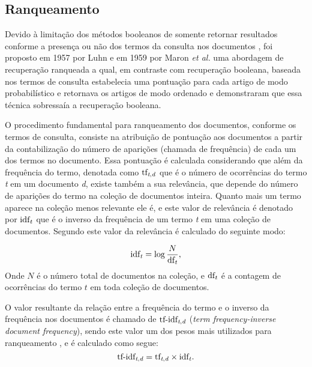 \subsection{Ranqueamento} \label{subsec:Ranqueamento}
Devido à limitação dos métodos booleanos de somente retornar resultados conforme a presença ou não dos termos da consulta nos documentos \cite[p.~100]{Manning2008IIR}, foi proposto em 1957 por Luhn e em 1959 por Maron \textit{et al.} uma abordagem de recuperação ranqueada \cite[p.~1446]{Sanderson2012THIRR} a qual, em contraste com recuperação booleana, baseada nos termos de consulta estabelecia uma pontuação para cada artigo de modo probabilístico e retornava os artigos de modo ordenado e demonstraram que essa técnica sobressaía a recuperação booleana.

O procedimento fundamental para ranqueamento dos documentos, conforme os termos de consulta, consiste na atribuição de pontuação aos documentos a partir da contabilização do número de aparições (chamada de frequência) de cada um dos termos no documento.
Essa pontuação é calculada considerando que além da frequência do termo, denotada como $\text{tf}_{\text{\textit{t},\textit{d}}}$ que é o número de ocorrências do termo \textit{t} em um documento \textit{d}, existe também a sua relevância, que depende do número de aparições do termo na coleção de documentos inteira.
Quanto mais um termo aparece na coleção menos relevante ele é, e este valor de relevância é denotado por $\text{idf}_{\text{\textit{t}}}$ que é o inverso da frequência de um termo \textit{t} em uma coleção de documentos.
Segundo  este valor da relevância é calculado do seguinte modo:

\begin{equation}
    \label{eq:inverse-document-frequency}
    \text{idf}_{\text{\textit{t}}} = \log{\frac{N}{\text{df}_{\text{\textit{t}}}}},
\end{equation}
Onde $N$ é o número total de documentos na coleção, e $\text{df}_{\text{\textit{t}}}$ é a contagem de ocorrências do termo $t$ em toda coleção de documentos.

O valor resultante da relação entre a frequência do termo e o inverso da frequência nos documentos é chamado de $\text{tf-idf}_{\text{\textit{t},\textit{d}}}$ (\textit{term frequency-inverse document frequency}), sendo este valor um dos pesos mais utilizados para ranqueamento \cite[p.~107--110]{Manning2008IIR}, e é calculado  como segue:
\begin{equation}
    \label{eq:tf-idf}
    \text{tf-idf}_{\text{\textit{t},\textit{d}}}  = \text{tf}_{\text{\textit{t},\textit{d}}} \times \text{idf}_{\text{\textit{t}}}.
\end{equation}

